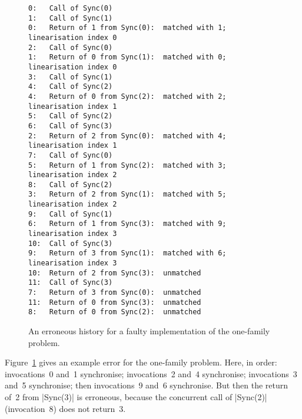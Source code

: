 \begin{figure}
\errorsize
\begin{verbatim}
0:   Call of Sync(0)         
1:   Call of Sync(1)         
0:   Return of 1 from Sync(0):  matched with 1; linearisation index 0
2:   Call of Sync(0)         
1:   Return of 0 from Sync(1):  matched with 0; linearisation index 0
3:   Call of Sync(1)         
4:   Call of Sync(2)         
4:   Return of 0 from Sync(2):  matched with 2; linearisation index 1
5:   Call of Sync(2)         
6:   Call of Sync(3)         
2:   Return of 2 from Sync(0):  matched with 4; linearisation index 1
7:   Call of Sync(0)         
5:   Return of 1 from Sync(2):  matched with 3; linearisation index 2
8:   Call of Sync(2)         
3:   Return of 2 from Sync(1):  matched with 5; linearisation index 2
9:   Call of Sync(1)         
6:   Return of 1 from Sync(3):  matched with 9; linearisation index 3
10:  Call of Sync(3)         
9:   Return of 3 from Sync(1):  matched with 6; linearisation index 3
10:  Return of 2 from Sync(3):  unmatched
11:  Call of Sync(3)         
7:   Return of 3 from Sync(0):  unmatched
11:  Return of 0 from Sync(3):  unmatched
8:   Return of 0 from Sync(2):  unmatched
\end{verbatim}
\caption{An erroneous history for a faulty implementation of the one-family
  problem.  \label{fig:one-family-error}}
\end{figure}


Figure~\ref{fig:one-family-error} gives an example error for the one-family
problem.  Here, in order: invocations~0 and~1 synchronise; invocations~2 and~4
synchronise; invocations~3 and~5 synchronise; then invocations~9 and~6
synchronise.  But then the return of~2 from |Sync(3)| is erroneous, because
the concurrent call of |Sync(2)| (invocation~8) does not return~3.




